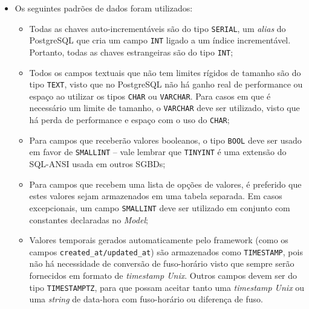 \documentclass[12pt,a4paper,twoside,hyphens,english,brazil]{abntex2}
\begin{document}
{\begin{itemize}
\begin{itemize}
			\item Todas as entidades fortes terão uma única chave primária auto-incrementável, chamada \texttt{id};
			\item As chaves estrangeiras têm o formato de \texttt{<tabela\_singular>\_id}, visto que referenciam um único objeto da outra tabela. O nome da tabela pode ser modificado caso ofereça maior clareza (por exemplo, em casos de várias entidades fracas similares ou auto-relacionamentos);
			\item Entidades fracas são nomeadas no formato \texttt{tabela1\_tabela2}, utilizando a versão singular das tabelas e ordenando-as em ordem alfabética. Caso necessário, o nome da entidade pode ser alterado nos mesmos moldes das chaves estrangeiras, acima.
		\end{itemize}
	\item Os seguintes padrões de dados foram utilizados:
		\begin{itemize}
			\item Todas as chaves auto-incrementáveis são do tipo \texttt{SERIAL}, um \emph{alias} do PostgreSQL que cria um campo \texttt{INT} ligado a um índice incrementável. Portanto, todas as chaves estrangeiras são do tipo \texttt{INT};
			\item Todos os campos textuais que não tem limites rígidos de tamanho são do tipo \texttt{TEXT}, visto que no PostgreSQL não há ganho real de performance ou espaço ao utilizar os tipos \texttt{CHAR} ou \texttt{VARCHAR}. Para casos em que é necessário um limite de tamanho, o \texttt{VARCHAR} deve ser utilizado, visto que há perda de performance e espaço com o uso do \texttt{CHAR}\cite{postgre-text-performance};
			\item Para campos que receberão valores booleanos, o tipo \texttt{BOOL} deve ser usado em favor de \texttt{SMALLINT} -- vale lembrar que \texttt{TINYINT} é uma extensão do SQL-ANSI usada em outros SGBDs;
			\item Para campos que recebem uma lista de opções de valores, é preferido que estes valores sejam armazenados em uma tabela separada. Em casos excepcionais, um campo \texttt{SMALLINT} deve ser utilizado em conjunto com constantes declaradas no \emph{Model};
			\item Valores temporais gerados automaticamente pelo framework (como os campos \texttt{created\_at/updated\_at}) são armazenados como \texttt{TIMESTAMP}, pois não há necessidade de conversão de fuso-horário visto que sempre serão fornecidos em formato de \emph{timestamp Unix}. Outros campos devem ser do tipo \texttt{TIMESTAMPTZ}, para que possam aceitar tanto uma \emph{timestamp Unix} ou uma \emph{string} de data-hora com fuso-horário ou diferença de fuso\cite{postgre-timezone-storage}.
		\end{itemize}
\end{itemize}

}
\end{document}
